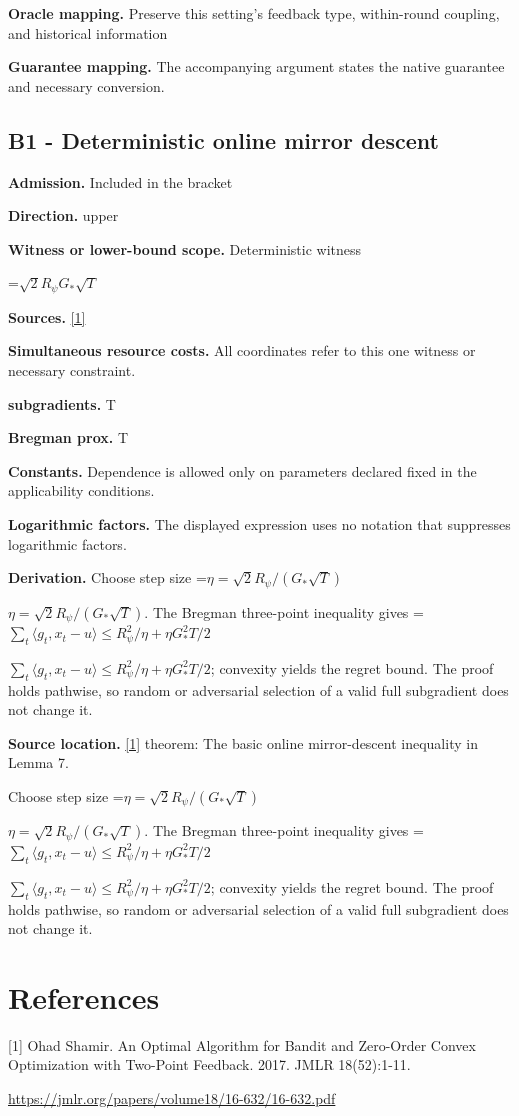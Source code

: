 \documentclass[10pt,a4paper]{article}
\newcommand{\AtlasMath}[1]{\par\begingroup\centering\setbox0=\hbox{$\displaystyle #1$}\ifdim\wd0>1.4\linewidth\typeout{ATLAS WIDE FORMULA: \the\wd0}\fi\ifdim\wd0>\linewidth\resizebox{\linewidth}{!}{\box0}\else\box0\fi\par\endgroup}
\newcommand{\AtlasInlineMath}[1]{\begingroup\setbox0=\hbox{$#1$}\ifdim\wd0>.4\linewidth\endgroup\AtlasMath{#1}\else\endgroup$#1$\fi}
\begin{document}
\textbf{Oracle mapping.} Preserve this setting's feedback type, within-round coupling, and historical information

\textbf{Guarantee mapping.} The accompanying argument states the native guarantee and necessary conversion.

\subsection{B1 - Deterministic online mirror descent}
\textbf{Admission.} Included in the bracket

\textbf{Direction.} upper

\textbf{Witness or lower-bound scope.} Deterministic witness

\AtlasMath{\sqrt2 R_\psi G_*\sqrt T}
\textbf{Sources.} \href{https://jmlr.org/papers/volume18/16-632/16-632.pdf}{[1]}

\textbf{Simultaneous resource costs.} All coordinates refer to this one witness or necessary constraint.

\textbf{subgradients.} T

\textbf{Bregman prox.} T

\textbf{Constants.} Dependence is allowed only on parameters declared fixed in the applicability conditions.

\textbf{Logarithmic factors.} The displayed expression uses no notation that suppresses logarithmic factors.

\textbf{Derivation.} Choose step size \AtlasInlineMath{\eta=\sqrt2R_\psi/(G_*\sqrt T)}. The Bregman three-point inequality gives \AtlasInlineMath{\sum_t\langle g_t,x_t-u\rangle\le R_\psi^2/\eta+\eta G_*^2T/2}; convexity yields the regret bound. The proof holds pathwise, so random or adversarial selection of a valid full subgradient does not change it.

\textbf{Source location.} \href{https://jmlr.org/papers/volume18/16-632/16-632.pdf}{[1]} theorem: The basic online mirror-descent inequality in Lemma 7.

Choose step size \AtlasInlineMath{\eta=\sqrt2R_\psi/(G_*\sqrt T)}. The Bregman three-point inequality gives \AtlasInlineMath{\sum_t\langle g_t,x_t-u\rangle\le R_\psi^2/\eta+\eta G_*^2T/2}; convexity yields the regret bound. The proof holds pathwise, so random or adversarial selection of a valid full subgradient does not change it.

\section{References}
[1] Ohad Shamir. An Optimal Algorithm for Bandit and Zero-Order Convex Optimization with Two-Point Feedback. 2017. JMLR 18(52):1-11.

\url{https://jmlr.org/papers/volume18/16-632/16-632.pdf}
\end{document}
